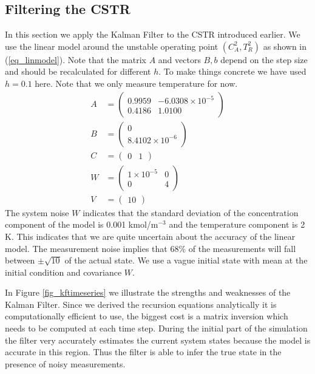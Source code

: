 \subsection{Filtering the CSTR}
In this section we apply the Kalman Filter to the CSTR introduced earlier. We use the linear model around the unstable operating point $(C_A^2, T_R^2)$ as shown in (\ref{eq_linmodel}). Note that the matrix $A$ and vectors $B, b$ depend on the step size and should be recalculated for different $h$. To make things concrete we have used $h=0.1$ here. Note that we only measure temperature for now.
\begin{equation}
\begin{aligned}
A &= \begin{pmatrix}
0.9959 & -6.0308\times 10^{-5} \\
0.4186 & 1.0100
\end{pmatrix} \\
B &= \begin{pmatrix}
0 \\ 8.4102\times 10^{-6}
\end{pmatrix} \\
C &= \begin{pmatrix}
0 & 1
\end{pmatrix} \\
W &= \begin{pmatrix}
1\times 10^{-5} & 0 \\ 0 & 4
\end{pmatrix} \\
V &= \begin{pmatrix}
10
\end{pmatrix}
\end{aligned}
\label{eq_linmodel}
\end{equation}
The system noise $W$ indicates that the standard deviation of the concentration component of the model is 0.001 kmol/m$^{-3}$ and the temperature component is 2 K. This indicates that we are quite uncertain about the accuracy of the linear model. The measurement noise implies that 68\% of the measurements will fall between $\pm\sqrt{10}$ of the actual state. We use a vague initial state with mean at the initial condition and covariance $W$.

In Figure \ref{fig_kftimeseries} we illustrate the strengths and weaknesses of the Kalman Filter. Since we derived the recursion equations analytically it is computationally efficient to use, the biggest cost is a matrix inversion which needs to be computed at each time step. During the initial part of the simulation the filter very accurately estimates the current system states because the model is accurate in this region. Thus the filter is able to infer the true state in the presence of noisy measurements. 

